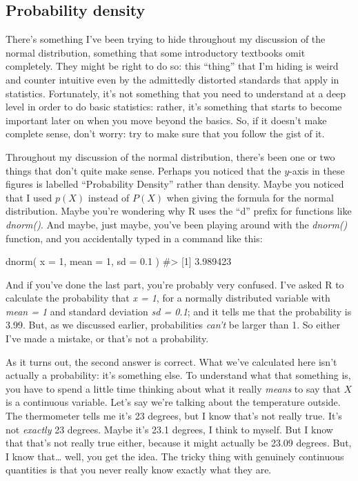 \documentclass[
  letterpaper,
  DIV=11,
  numbers=noendperiod]{scrreprt}
\newenvironment{Shaded}{\begin{snugshade}}{\end{snugshade}}
\newcommand{\AttributeTok}[1]{\textcolor[rgb]{0.40,0.45,0.13}{#1}}
\newcommand{\CommentTok}[1]{\textcolor[rgb]{0.37,0.37,0.37}{#1}}
\newcommand{\DecValTok}[1]{\textcolor[rgb]{0.68,0.00,0.00}{#1}}
\newcommand{\FloatTok}[1]{\textcolor[rgb]{0.68,0.00,0.00}{#1}}
\newcommand{\FunctionTok}[1]{\textcolor[rgb]{0.28,0.35,0.67}{#1}}
\newcommand{\NormalTok}[1]{\textcolor[rgb]{0.00,0.23,0.31}{#1}}
\begin{document}
\subsection{Probability density}\label{probability-density}

There's something I've been trying to hide throughout my discussion of
the normal distribution, something that some introductory textbooks omit
completely. They might be right to do so: this ``thing'' that I'm hiding
is weird and counter intuitive even by the admittedly distorted
standards that apply in statistics. Fortunately, it's not something that
you need to understand at a deep level in order to do basic statistics:
rather, it's something that starts to become important later on when you
move beyond the basics. So, if it doesn't make complete sense, don't
worry: try to make sure that you follow the gist of it.

Throughout my discussion of the normal distribution, there's been one or
two things that don't quite make sense. Perhaps you noticed that the
\(y\)-axis in these figures is labelled ``Probability Density'' rather
than density. Maybe you noticed that I used \(p(X)\) instead of \(P(X)\)
when giving the formula for the normal distribution. Maybe you're
wondering why R uses the ``d'' prefix for functions like \emph{dnorm()}.
And maybe, just maybe, you've been playing around with the
\emph{dnorm()} function, and you accidentally typed in a command like
this:

\begin{Shaded}
\begin{Highlighting}[]
\FunctionTok{dnorm}\NormalTok{( }\AttributeTok{x =} \DecValTok{1}\NormalTok{, }\AttributeTok{mean =} \DecValTok{1}\NormalTok{, }\AttributeTok{sd =} \FloatTok{0.1}\NormalTok{ )}
\CommentTok{\#\textgreater{} [1] 3.989423}
\end{Highlighting}
\end{Shaded}

And if you've done the last part, you're probably very confused. I've
asked R to calculate the probability that \emph{x = 1}, for a normally
distributed variable with \emph{mean = 1} and standard deviation
\emph{sd = 0.1}; and it tells me that the probability is 3.99. But, as
we discussed earlier, probabilities \emph{can't} be larger than 1. So
either I've made a mistake, or that's not a probability.

As it turns out, the second answer is correct. What we've calculated
here isn't actually a probability: it's something else. To understand
what that something is, you have to spend a little time thinking about
what it really \emph{means} to say that \(X\) is a continuous variable.
Let's say we're talking about the temperature outside. The thermometer
tells me it's 23 degrees, but I know that's not really true. It's not
\emph{exactly} 23 degrees. Maybe it's 23.1 degrees, I think to myself.
But I know that that's not really true either, because it might actually
be 23.09 degrees. But, I know that\ldots{} well, you get the idea. The
tricky thing with genuinely continuous quantities is that you never
really know exactly what they are.
\end{document}
